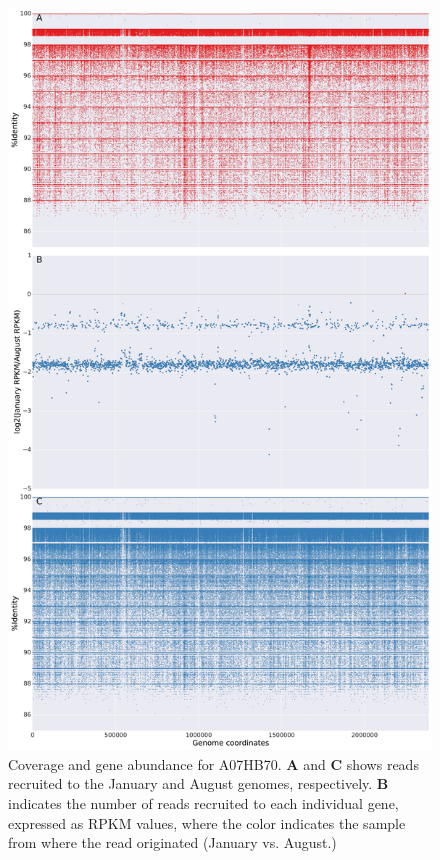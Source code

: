 \begin{figure}[!hbtp]
  \centering
  \includegraphics[width=\textwidth,height=0.8\textheight,keepaspectratio]{Chapter5/Figures/coverage_plots/A07HB70_coverage.pdf}
  \caption{Coverage and gene abundance for A07HB70. \textbf{A} and \textbf{C} shows reads recruited to the January and August genomes, respectively. \textbf{B} indicates the number of reads recruited to each individual gene, expressed as RPKM values, where the color indicates the sample from where the read originated (January vs. August.)}
  \label{A07HB70coverage}
\end{figure}

